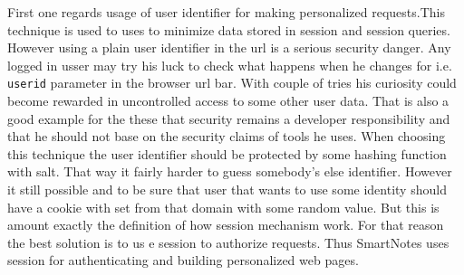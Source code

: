 \begin{itemize}
{First one regards usage of user identifier for making personalized requests.This technique is used to uses to minimize data stored in session and session queries. However using a plain user identifier in the url is a serious security danger. Any logged in usser may try his luck to check what happens when he changes for i.e. \texttt{userid} parameter in the browser url bar. With couple of tries his curiosity could become rewarded in uncontrolled access to some other user data. That is also a good example for the these that security remains a developer responsibility and that he should not base on the security claims of tools he uses. When choosing this technique the user identifier should be protected by some hashing function with salt. That way it fairly harder to guess somebody's else identifier. However it still possible and to be sure that user that wants to use some identity should have a cookie with set from that domain with some random value. But this is amount exactly the definition of how session mechanism work. For that reason the best solution is to us e session to authorize requests. Thus SmartNotes uses session for authenticating and building personalized web pages.    

}
\end{itemize}
